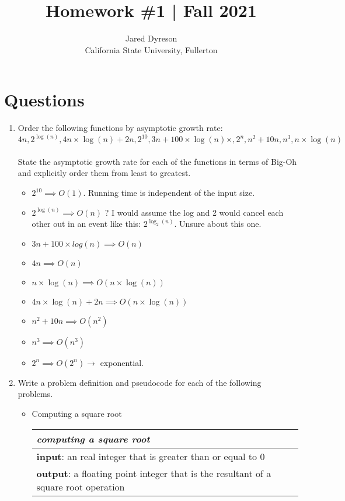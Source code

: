 \documentclass{article}
\title{Homework \#1 | Fall 2021}
\author{Jared Dyreson\\ 
        California State University, Fullerton}
\begin{document}
\maketitle
\tableofcontents

\newpage


\section{Questions}

\begin{enumerate}

\item Order the following functions by asymptotic growth rate: \\

$$4n, 2^{\log(n)}, 4n \times \log(n) + 2n, 2^{10}, 3n + 100\times \log(n) \times, 2^{n}, n^{2} + 10n, n^{3}, n \times \log(n)$$ \\
State the asymptotic growth rate for each of the functions in terms of Big-Oh and explicitly order them from least to greatest.


\begin{itemize}
\item $2 ^ {10} \implies O(1)$. Running time is independent of the input size.
\item $2^{\log(n)} \implies O(n)$ ? I would assume the log and 2 would cancel each other out in an event like this: $2^{\log_2(n)}$. Unsure about this one.
\item $3n + 100 \times log(n) \implies O(n)$
\item $4n \implies O(n)$
\item $n \times \log(n) \implies O(n \times \log(n))$
\item $4n \times \log(n) + 2n \implies O(n \times \log(n))$
\item $n^{2} + 10n \implies O(n^{2})$
\item $n^{3} \implies O(n^{3})$
\item $2^{n} \implies O(2^{n}) \rightarrow$ exponential.
\end{itemize}

\item Write a problem definition and pseudocode for each of the following problems.
\begin{itemize}
\item Computing a square root
\begin{table}[!htbp]
\centering
\begin{tabular}{|l|}
\hline
\textit{computing a square root} \\ \hline
\textbf{input}: an real integer that is greater than or equal to 0 \\ \hline
\textbf{output}: a floating point integer that is the resultant of a square root operation \\ \hline
\end{tabular}
\end{table}


\end{itemize}
\end{enumerate}
\end{document}
